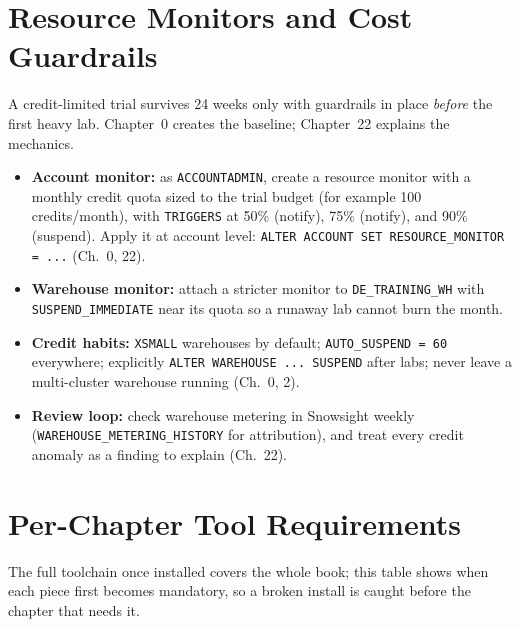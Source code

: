 \section{Resource Monitors and Cost Guardrails}
A credit-limited trial survives 24 weeks only with guardrails in place \emph{before} the first
heavy lab. Chapter~0 creates the baseline; Chapter~22 explains the mechanics.
\begin{itemize}
    \item \textbf{Account monitor:} as \texttt{ACCOUNTADMIN}, create a resource monitor with a
    monthly credit quota sized to the trial budget (for example 100 credits/month), with
    \texttt{TRIGGERS} at 50\% (notify), 75\% (notify), and 90\% (suspend). Apply it at account
    level: \texttt{ALTER ACCOUNT SET RESOURCE\_MONITOR = ...} (Ch.~0, 22).
    \item \textbf{Warehouse monitor:} attach a stricter monitor to \texttt{DE\_TRAINING\_WH}
    with \texttt{SUSPEND\_IMMEDIATE} near its quota so a runaway lab cannot burn the month.
    \item \textbf{Credit habits:} \texttt{XSMALL} warehouses by default; \texttt{AUTO\_SUSPEND
    = 60} everywhere; explicitly \texttt{ALTER WAREHOUSE ... SUSPEND} after labs; never leave a
    multi-cluster warehouse running (Ch.~0, 2).
    \item \textbf{Review loop:} check warehouse metering in Snowsight weekly
    (\texttt{WAREHOUSE\_METERING\_HISTORY} for attribution), and treat every credit anomaly as
    a finding to explain (Ch.~22).
\end{itemize}

\section{Per-Chapter Tool Requirements}
The full toolchain once installed covers the whole book; this table shows when each piece first
becomes mandatory, so a broken install is caught before the chapter that needs it.

